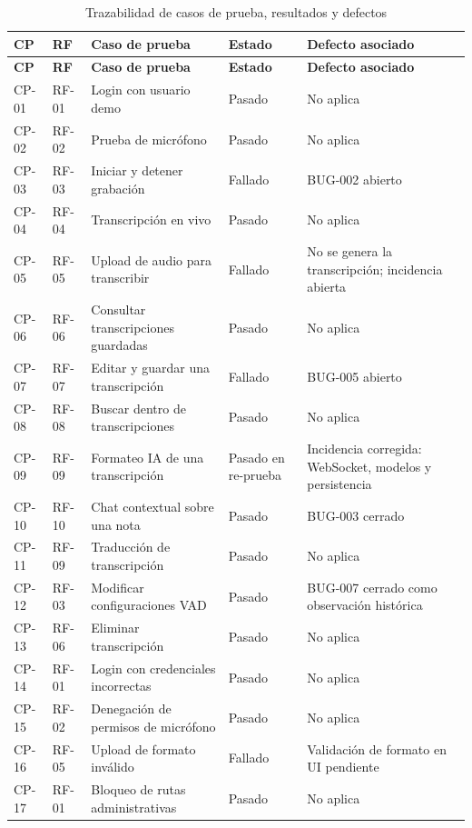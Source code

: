 \begin{longtable}{p{1.6cm}p{1.6cm}p{6.2cm}p{2.4cm}p{4.8cm}}
\caption{Trazabilidad de casos de prueba, resultados y defectos}
\label{tab:trazabilidad-casos}\\
\toprule
\textbf{CP} & \textbf{RF} & \textbf{Caso de prueba} & \textbf{Estado} & \textbf{Defecto asociado}\\
\midrule
\endfirsthead
\toprule
\textbf{CP} & \textbf{RF} & \textbf{Caso de prueba} & \textbf{Estado} & \textbf{Defecto asociado}\\
\midrule
\endhead
\bottomrule
\endfoot

CP-01 & RF-01 & Login con usuario demo & \textcolor{PasoColor}{Pasado} & No aplica\\
CP-02 & RF-02 & Prueba de micrófono & \textcolor{PasoColor}{Pasado} & No aplica\\
CP-03 & RF-03 & Iniciar y detener grabación & \textcolor{FalloColor}{Fallado} & BUG-002 abierto\\
CP-04 & RF-04 & Transcripción en vivo & \textcolor{PasoColor}{Pasado} & No aplica\\
CP-05 & RF-05 & Upload de audio para transcribir & \textcolor{FalloColor}{Fallado} & No se genera la transcripción; incidencia abierta\\
CP-06 & RF-06 & Consultar transcripciones guardadas & \textcolor{PasoColor}{Pasado} & No aplica\\
CP-07 & RF-07 & Editar y guardar una transcripción & \textcolor{FalloColor}{Fallado} & BUG-005 abierto\\
CP-08 & RF-08 & Buscar dentro de transcripciones & \textcolor{PasoColor}{Pasado} & No aplica\\
CP-09 & RF-09 & Formateo IA de una transcripción & \textcolor{PasoColor}{Pasado en re-prueba} & Incidencia corregida: WebSocket, modelos y persistencia\\
CP-10 & RF-10 & Chat contextual sobre una nota & \textcolor{PasoColor}{Pasado} & BUG-003 cerrado\\
CP-11 & RF-09 & Traducción de transcripción & \textcolor{PasoColor}{Pasado} & No aplica\\
CP-12 & RF-03 & Modificar configuraciones VAD & \textcolor{PasoColor}{Pasado} & BUG-007 cerrado como observación histórica\\
CP-13 & RF-06 & Eliminar transcripción & \textcolor{PasoColor}{Pasado} & No aplica\\
CP-14 & RF-01 & Login con credenciales incorrectas & \textcolor{PasoColor}{Pasado} & No aplica\\
CP-15 & RF-02 & Denegación de permisos de micrófono & \textcolor{PasoColor}{Pasado} & No aplica\\
CP-16 & RF-05 & Upload de formato inválido & \textcolor{FalloColor}{Fallado} & Validación de formato en UI pendiente\\
CP-17 & RF-01 & Bloqueo de rutas administrativas & \textcolor{PasoColor}{Pasado} & No aplica\\

\bottomrule
\end{longtable}

